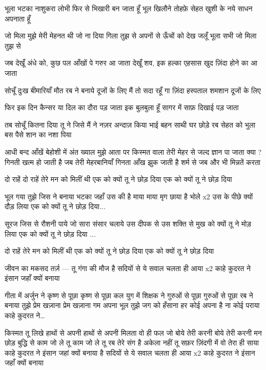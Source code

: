 भूला भटका नाशुकरा लोभी
फिर से भिखारी बन जाता हूँ 
भूल खिलौने तोहफ़े सेहत
खुशी के नये साधन अपनाता हूँ 

जो मिला मुझे मेरी मेहनत थी
जो ना दिया गिला तुझ से
अपनों से ऊँचों को देख जलूँ
भूला सभी जो मिला तुझ से

जब देखूँ अंधे को, कुछ पल
आँखों पे गरुर आ जाता
देखूँ शव, इक हल्का एहसास
खुद ज़िंदा होने का आ जाता

सोचूँ दुःख बीमारियाँ मौत
रब ने बनाये दूजों के लिए
मैं तो सदा रहूँ गा ज़िंदा
हस्पताल शमशान दूजों के लिए

फिर इक दिन कैन्सर या
दिल का दौरा पड़ जाता
इक बुलबुला हूँ सागर में
साफ़ दिखाई पड़ जाता

तब सोचूँ कितना दिया तू ने
जिसे मैं ने नज़र अन्दाज़ किया
भाई बहन साथी घर छोड़े
रब सेहत को भुला बस
पैसे शान का नशा पिया

आधी बन्द आँखें बेहोशी में
अंत ख्याल मुझे आता
पर किस्मत वाला तेरी मेहर से
जल्द ज्ञान पा जाता
क्या ?
गिनती खत्म हो जाती है
जब तेरी मेहरबानियाँ गिनता
आँख झुक जाती है शर्म से
जब और भी मिन्नतें करता

दो राहें
दो राहें तेरे मन को मिलीं थी
एक को क्यों तू ने छोड़ दिया
एक को क्यों तू ने छोड़ दिया

भूल गया तुझे जिस ने बनाया
भटका जहाँ उस की है माया
माया मृग छाया है भोले x2
उस के पीछे क्यों दौड़ लिया
एक को क्यों तू ने छोड़ दिया...

सूरज जिस से रौशनी पाये
जो सारा संसार चलाये
उस दीपक से उस शक्ति से
मुख को क्यों तू ने मोड़ लिया
एक को क्यों तू ने छोड़ दिया ...

दो राहें तेरे मन को मिलीं थी
एक को क्यों तू ने छोड़ दिया
एक को क्यों तू ने छोड़ दिया

जीवन का मकसद
तर्ज़ — तू गंगा की मौज
है सदियों से ये सवाल चलता ही आया x2
काहे कुदरत ने इंसान जहाँ क्यों बनाया

गीता में अर्जुन ने कृष्ण से पूछा
कृष्ण से पूछा
कल युग में शिक्षक ने गुरुओं से पूछा
गुरुओं से पूछा
रब ने बनाया तुझे प्रेम खज़ाना
प्रेम खज़ाना
गम अपना भूल तुझे जग को हँसाना
हर कोई अपना है ना कोई पराया
काहे कुदरत ने…

किस्मत तू लिखे हाथों से अपनी
हाथों से अपनी
मिलता वो ही फल जो बोये तेरी करनी
बोये तेरी करनी
मन छोड़ बुद्धि से काम जो ले तू
काम जो ले तू
रब तेरे संग है अकेला नहीं तू
सफ़र ज़िंदगी में वो तेरा ही साया
काहे कुदरत ने इंसान जहां क्यों बनाया
है सदियों से ये सवाल चलता ही आया x2
काहे कुदरत ने इंसान जहाँ क्यों बनाया
























